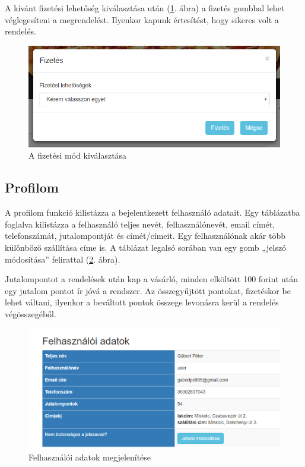 A kívánt fizetési lehetőség kiválasztása után (\ref{fig:payment}. ábra) a fizetés gombbal lehet véglegesíteni a megrendelést. Ilyenkor kapunk értesítést, hogy sikeres volt a rendelés.

\begin{figure}
\centering
\includegraphics[scale=0.8]{kepek/payment.png}
\caption{A fizetési mód kiválasztása}
\label{fig:payment}
\end{figure}

\subsection{Profilom}

A profilom funkció kilistázza a bejelentkezett felhasználó adatait. Egy táblázatba foglalva kilistázza a felhasználó teljes nevét, felhasználónevét, email címét, telefonszámát, jutalompontját és címét/címeit. Egy felhasználónak akár több különböző szállítása címe is. A táblázat legalsó sorában van egy gomb „jelszó módosítása” felirattal (\ref{fig:profile}. ábra).

Jutalompontot a rendelések után kap a vásárló, minden elköltött 100 forint után egy jutalom pontot ír jóvá a rendszer. Az összegyűjtött pontokat, fizetéskor be lehet váltani, ilyenkor a beváltott pontok összege levonásra kerül a rendelés végösszegéből.

\begin{figure}
\centering
\includegraphics[scale=0.6]{kepek/profile.png}
\caption{Felhasználói adatok megjelenítése}
\label{fig:profile}
\end{figure}

